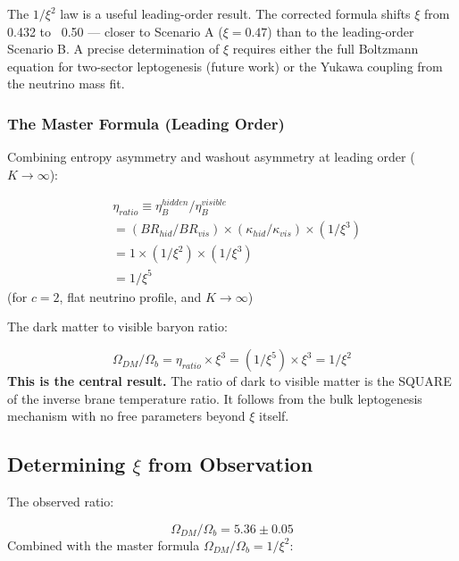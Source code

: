 \documentclass[aps,prd,preprint,superscriptaddress,longbibliography]{revtex4-2}
\begin{document}
The $1/\xi^{2}$ law is a useful leading-order result. The corrected formula shifts $\xi$ from 0.432 to ~0.50 --- closer to Scenario A ($\xi = 0.47$) than to the leading-order Scenario B. A precise determination of $\xi$ requires either the full Boltzmann equation for two-sector leptogenesis (future work) or the Yukawa coupling from the neutrino mass fit.


\subsubsection{The Master Formula (Leading Order)}

Combining entropy asymmetry and washout asymmetry at leading order ($K \to \infty$):


\begin{align}
    & \eta_{ratio} \equiv \eta_B^{hidden} / \eta_B^{visible} \\
    & = (BR_{hid}/BR_{vis}) \times (\kappa_{hid}/\kappa_{vis}) \times (1/\xi^{3}) \\
    & = 1 \times (1/\xi^{2}) \times (1/\xi^{3}) \\
    & = 1/\xi^{5}
\end{align}
(for $c = 2$, flat neutrino profile, and $K \to \infty$)

The dark matter to visible baryon ratio:


\begin{equation}
    \Omega_{DM} / \Omega_b = \eta_{ratio} \times \xi^{3} = (1/\xi^{5}) \times \xi^{3} = 1/\xi^{2}
\end{equation}
\textbf{This is the central result.} The ratio of dark to visible matter is the SQUARE of the inverse brane temperature ratio. It follows from the bulk leptogenesis mechanism with no free parameters beyond $\xi$ itself.



\subsection{Determining $\xi$ from Observation}

The observed ratio:


\begin{equation}
    \Omega_{DM} / \Omega_b = 5.36 \pm 0.05
\end{equation}
Combined with the master formula $\Omega_{DM}/\Omega_b = 1/\xi^{2}$:
\end{document}
